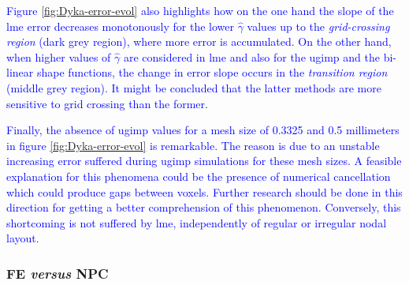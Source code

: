 \documentclass[preprint,12pt,a4paper]{elsarticle}
\begin{document}
\textcolor{blue}{Figure \eqref{fig:Dyka-error-evol} also highlights how on the one hand the slope of the \acrshort{lme} error decreases monotonously for the lower $\widehat{\gamma}$ values up to the \textit{grid-crossing region} (dark grey region), where more error is accumulated. On the other hand, when higher values of $\widehat{\gamma}$ are considered in \acrshort{lme} and also for the \acrshort{ugimp} and the bi-linear shape functions, the change in error slope occurs in the \textit{transition region} (middle grey region). It might be concluded that the latter methods are more sensitive to grid crossing than the former}.

\textcolor{blue}{Finally,  the absence of \acrshort{ugimp} values for a mesh size of 0.3325 and 0.5 millimeters in figure \eqref{fig:Dyka-error-evol} is remarkable. The reason is due to an unstable increasing error suffered during \acrshort{ugimp} simulations for these mesh sizes. A feasible explanation for this phenomena could be the presence of numerical cancellation which could produce gaps between voxels. Further research should be done in this direction for getting a better comprehension of this phenomenon. Conversely, this shortcoming is not suffered by \acrshort{lme}, independently of regular or irregular nodal layout.}

\subsubsection{FE \textit{versus} NPC}
\label{sec:FE-vs-NPC}
\end{document}
